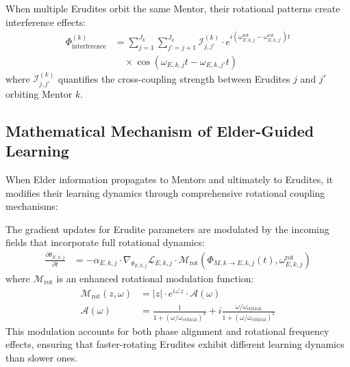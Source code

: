 \begin{definition}
When multiple Erudites orbit the same Mentor, their rotational patterns create interference effects:
\begin{align}
\Phi_{\text{interference}}^{(k)} &= \sum_{j=1}^{J_k} \sum_{j'=j+1}^{J_k} \mathcal{I}_{j,j'}^{(k)} \cdot e^{i(\omega_{E,k,j}^{\text{rot}} - \omega_{E,k,j'}^{\text{rot}})t} \\
&\quad \times \cos(\omega_{E,k,j} t - \omega_{E,k,j'} t)
\end{align}
where $\mathcal{I}_{j,j'}^{(k)}$ quantifies the cross-coupling strength between Erudites $j$ and $j'$ orbiting Mentor $k$.
\end{definition}

\subsection{Mathematical Mechanism of Elder-Guided Learning}

When Elder information propagates to Mentors and ultimately to Erudites, it modifies their learning dynamics through comprehensive rotational coupling mechanisms:

\begin{theorem}
The gradient updates for Erudite parameters are modulated by the incoming fields that incorporate full rotational dynamics:
\begin{align}
\frac{\partial \theta_{E,k,j}}{\partial t} &= -\alpha_{E,k,j} \cdot \nabla_{\theta_{E,k,j}} \mathcal{L}_{E,k,j} \cdot \mathcal{M}_{\text{rot}}(\Phi_{M,k \rightarrow E,k,j}(t), \omega_{E,k,j}^{\text{rot}})
\end{align}
where $\mathcal{M}_{\text{rot}}$ is an enhanced rotational modulation function:
\begin{align}
\mathcal{M}_{\text{rot}}(z, \omega) &= |z| \cdot e^{i\angle z} \cdot \mathcal{A}(\omega) \\
\mathcal{A}(\omega) &= \frac{1}{1 + (\omega/\omega_{\text{critical}})^2} + i\frac{\omega/\omega_{\text{critical}}}{1 + (\omega/\omega_{\text{critical}})^2}
\end{align}
This modulation accounts for both phase alignment and rotational frequency effects, ensuring that faster-rotating Erudites exhibit different learning dynamics than slower ones.
\end{theorem}

